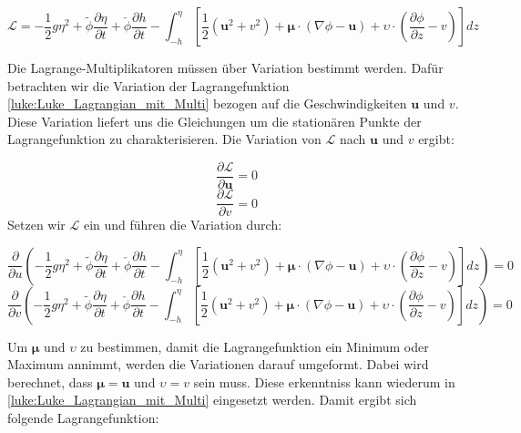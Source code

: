 \begin{equation}
	\mathscr{L}
	=
	-
	\frac{1}{2} g \eta^2
	+
	\widetilde{\phi} \frac{\partial\eta}{\partial t}
	+
	\check{\phi} \frac{\partial h}{\partial t}
	-
	\int_{-h}^{\eta} \left[ \frac{1}{2} (\bm{u}^2 + v^2) + \bm{\mu} \cdot (\nabla\phi - \bm{u}) + \upsilon \cdot (\frac{\partial\phi}{\partial z} - v) \right] dz
	\label{luke:Luke_Lagrangian_mit_Multi}
\end{equation}

Die Lagrange-Multiplikatoren müssen über Variation bestimmt werden.
Dafür betrachten wir die Variation der Lagrangefunktion \eqref{luke:Luke_Lagrangian_mit_Multi} bezogen auf die Geschwindigkeiten $\bm{u}$ und $v$.
Diese Variation liefert uns die Gleichungen um die stationären Punkte der Lagrangefunktion zu charakterisieren. 
Die Variation von \(\mathscr{L}\) nach $\bm{u}$ und $v$ ergibt:

\begin{equation}
	\frac{\partial \mathscr{L}}{\partial \bm{u}} = 0	
\end{equation}
\begin{equation}
	\frac{\partial \mathscr{L}}{\partial v} = 0	
\end{equation}
Setzen wir $\mathscr{L}$ ein und führen die Variation durch:

\begin{equation}
	\frac{\partial}{\partial u} \left( -\frac{1}{2} g \eta^2 + \widetilde{\phi} \frac{\partial\eta}{\partial t} + \check{\phi} \frac{\partial h}{\partial t} - \int_{-h}^{\eta} \left[ \frac{1}{2} (\bm{u}^2 + v^2) + \bm{\mu} \cdot (\nabla\phi - \bm{u}) + \upsilon \cdot \left(\frac{\partial\phi}{\partial z} - v\right) \right] dz \right) = 0	
\end{equation}
\begin{equation}
	\frac{\partial}{\partial v} \left( -\frac{1}{2} g \eta^2 + \widetilde{\phi} \frac{\partial\eta}{\partial t} + \check{\phi} \frac{\partial h}{\partial t} - \int_{-h}^{\eta} \left[ \frac{1}{2} (\bm{u}^2 + v^2) + \bm{\mu} \cdot (\nabla\phi - \bm{u}) + \upsilon \cdot \left(\frac{\partial\phi}{\partial z} - v\right) \right] dz \right) = 0
\end{equation}

Um $\bm{\mu}$ und $\upsilon$ zu bestimmen, damit die Lagrangefunktion ein Minimum oder Maximum annimmt, werden die Variationen darauf umgeformt. Dabei wird berechnet, dass $\bm{\mu} = \bm{u}$ und $\upsilon = v$ sein muss.
Diese erkenntniss kann wiederum in \eqref{luke:Luke_Lagrangian_mit_Multi} eingesetzt werden. Damit ergibt sich folgende Lagrangefunktion:

